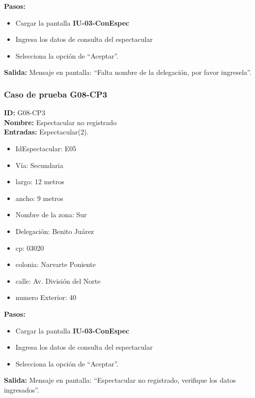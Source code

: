\textbf{Pasos:}
\begin{itemize}
    \item Cargar la pantalla \textbf{IU-03-ConEspec}
    \item Ingresa los datos de consulta del espectacular
    \item Selecciona la opción de ``Aceptar''.
\end{itemize}
\textbf{Salida:}
Mensaje en pantalla: ``Falta nombre de la delegación, por favor ingresela''.

\subsubsection{Caso de prueba G08-CP3}
\textbf{ID:} G08-CP3\\
\textbf{Nombre:} Espectacular no registrado\\
\textbf{Entradas:}
Espectacular(2). 
\begin{itemize}
    \item IdEspectacular: E05
    \item Vía: Secundaria
    \item largo: 12 metros
    \item ancho: 9 metros
    \item Nombre de la zona: Sur
    \item Delegación: Benito Juárez
    \item cp: 03020
    \item colonia: Narvarte Poniente
    \item calle: Av. División del Norte
    \item numero Exterior: 40
\end{itemize}

\textbf{Pasos:}
\begin{itemize}
    \item Cargar la pantalla \textbf{IU-03-ConEspec}
    \item Ingresa los datos de consulta del espectacular
    \item Selecciona la opción de ``Aceptar''.
\end{itemize}
\textbf{Salida:}
Mensaje en pantalla: ``Espectacular no registrado, verifique los datos ingresados''.

